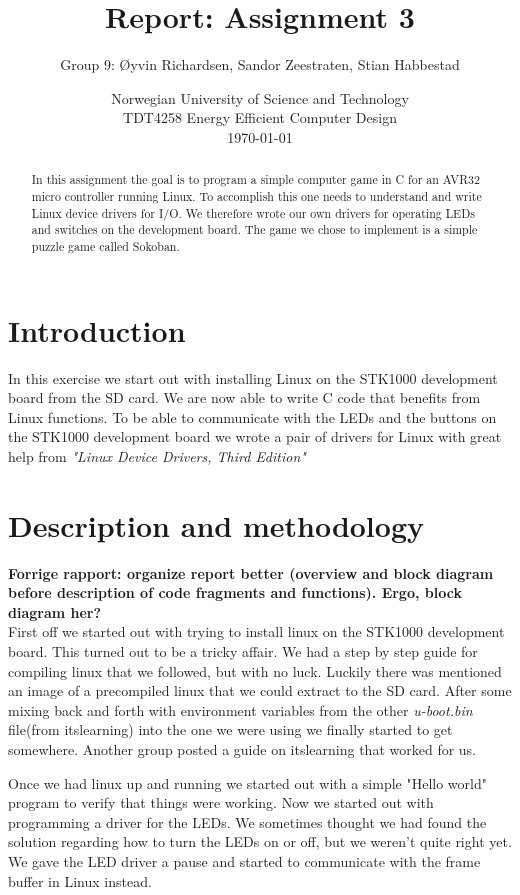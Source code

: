 \documentclass[a4paper,11pt]{article}
\title{\textbf{Report: Assignment 3}}
\author{Group 9: \O yvin Richardsen, Sandor Zeestraten, Stian Habbestad}
\date{{Norwegian University of Science and Technology \\
TDT4258 Energy Efficient Computer Design \\}
\today}
\begin{document}
\maketitle

\begin{abstract}
In this assignment the goal is to program a simple computer game in C for an AVR32 micro controller running Linux. To accomplish this one needs to understand and write Linux device drivers for I/O. We therefore wrote our own drivers for operating LEDs and switches on the development board. The game we chose to implement is a simple puzzle game called Sokoban.
\end{abstract}

\bigskip
\tableofcontents
\newpage

\section{Introduction}
In this exercise we start out with installing Linux on the STK1000 development board from the SD card. We are now able to write C code that benefits from Linux functions. %
To be able to communicate with the LEDs and the buttons on the STK1000 development board we wrote a pair of drivers for Linux with great help from \textit{"Linux Device Drivers, Third Edition"} \cite{ldd}


\section{Description and methodology}
\textbf{Forrige rapport: organize report better (overview and block diagram before description of code fragments and functions). Ergo, block diagram her?}\\

First off we started out with trying to install linux on the STK1000 development board. This turned out to be a tricky affair. We had a step by step guide for compiling linux that we followed, but with no luck. Luckily there was mentioned an image of a precompiled linux that we could extract to the SD card. After some mixing back and forth with environment variables from the other \textit{u-boot.bin} file(from itslearning) into the one we were using we finally started to get somewhere. Another group posted a guide on itslearning that worked for us.

Once we had linux up and running we started out with a simple "Hello world" program to verify that things were working. Now we started out with programming a driver for the LEDs. We sometimes thought we had found the solution regarding how to turn the LEDs on or off, but we weren't quite right yet. We gave the LED driver a pause and started to communicate with the frame buffer in Linux instead. 
\end{document}
